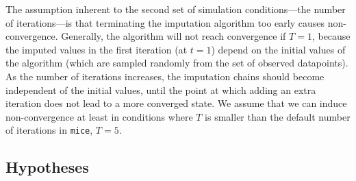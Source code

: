 \documentclass[Royal,times,sageh]{sagej}
\begin{document}
The assumption inherent to the second set of simulation conditions---the number of iterations---is that terminating the imputation algorithm too early causes non-convergence. Generally, the algorithm will not reach convergence if \(T=1\), because the imputed values in the first iteration (at \(t=1\)) depend on the initial values of the algorithm (which are sampled randomly from the set of observed datapoints). As the number of iterations increases, the imputation chains should become independent of the initial values, until the point at which adding an extra iteration does not lead to a more converged state. We assume that we can induce non-convergence at least in conditions where \(T\) is smaller than the default number of iterations in \texttt{mice}, \(T=5\).

\hypertarget{hypotheses}{%
\subsection{Hypotheses}\label{hypotheses}}
\end{document}
